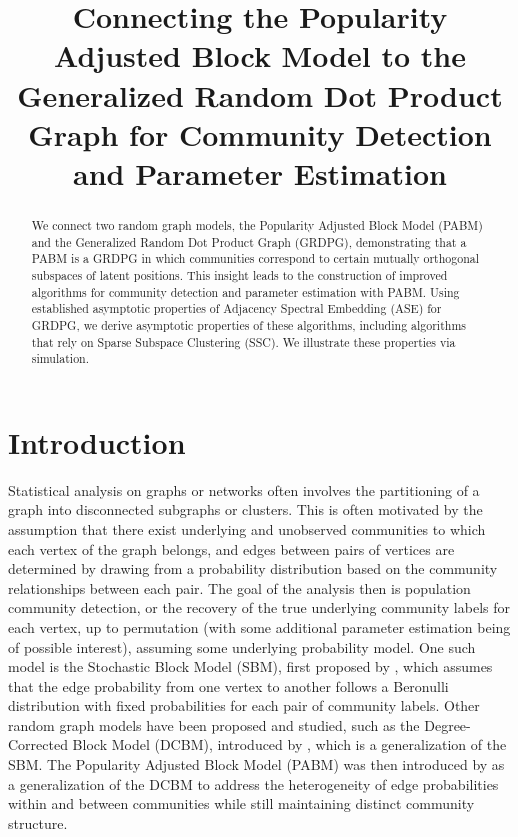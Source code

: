 \documentclass[
  12pt,
]{article}
\title{Connecting the Popularity Adjusted Block Model to the Generalized Random
Dot Product Graph for Community Detection and Parameter Estimation}
\author{}
\date{\vspace{-2.5em}}
\providecommand{\tightlist}{%
  \setlength{\itemsep}{0pt}\setlength{\parskip}{0pt}}
\begin{document}
\maketitle
\begin{abstract}
We connect two random graph models, the Popularity Adjusted Block Model
(PABM) and the Generalized Random Dot Product Graph (GRDPG),
demonstrating that a PABM is a GRDPG in which communities correspond to
certain mutually orthogonal subspaces of latent positions. This insight
leads to the construction of improved algorithms for community detection
and parameter estimation with PABM. Using established asymptotic
properties of Adjacency Spectral Embedding (ASE) for GRDPG, we derive
asymptotic properties of these algorithms, including algorithms that
rely on Sparse Subspace Clustering (SSC). We illustrate these properties
via simulation.
\end{abstract}

\providecommand{\tightlist}{%
  \setlength{\itemsep}{0pt}\setlength{\parskip}{0pt}}

\newcommand{\diag}{\text{diag}}
\newcommand{\tr}{\text{Tr}}
\newcommand{\blockdiag}{\text{blockdiag}}
\newcommand{\indep}{\stackrel{\text{indep}}{\sim}}
\newcommand{\iid}{\stackrel{\text{iid}}{\sim}}
\newcommand{\Bernoulli}{\text{Bernoulli}}
\newcommand{\Betadist}{\text{Beta}}
\newtheorem{definition}{Definition}
\newtheorem{theorem}{Theorem}
\newtheorem{lemma}{Lemma}
\theoremstyle{remark}
\newtheorem*{remark}{Remark}
\theoremstyle{example}
\newtheorem*{example}{Example}

\hypertarget{introduction}{%
\section{Introduction}\label{introduction}}

Statistical analysis on graphs or networks often involves the
partitioning of a graph into disconnected subgraphs or clusters. This is
often motivated by the assumption that there exist underlying and
unobserved communities to which each vertex of the graph belongs, and
edges between pairs of vertices are determined by drawing from a
probability distribution based on the community relationships between
each pair. The goal of the analysis then is population community
detection, or the recovery of the true underlying community labels for
each vertex, up to permutation (with some additional parameter
estimation being of possible interest), assuming some underlying
probability model. One such model is the Stochastic Block Model (SBM),
first proposed by \citet{doi:10.1080/0022250X.1971.9989788}, which
assumes that the edge probability from one vertex to another follows a
Beronulli distribution with fixed probabilities for each pair of
community labels. Other random graph models have been proposed and
studied, such as the Degree-Corrected Block Model (DCBM), introduced by
\citet{Karrer_2011}, which is a generalization of the SBM. The
Popularity Adjusted Block Model (PABM) was then introduced by
\citet*{307cbeb9b1be48299388437423d94bf1} as a generalization of the
DCBM to address the heterogeneity of edge probabilities within and
between communities while still maintaining distinct community
structure.
\end{document}
